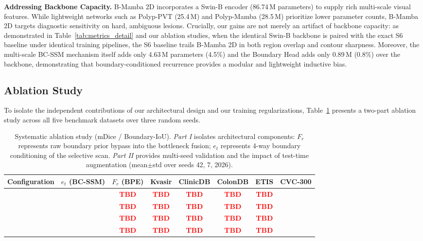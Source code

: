 \documentclass[journal]{IEEEtran}
\newcommand{\tbd}{\textcolor{red}{\textbf{TBD}}}
\newcommand{\ABrows}{%
    \ding{55} & \ding{55} & \tbd & \tbd & \tbd & \tbd & \tbd \\
    \ding{55} & \ding{51} & \tbd & \tbd & \tbd & \tbd & \tbd \\
    \ding{51} & \ding{55} & \tbd & \tbd & \tbd & \tbd & \tbd \\
    \ding{51} & \ding{51} & \tbd & \tbd & \tbd & \tbd & \tbd \\}}
\begin{document}
\textbf{Addressing Backbone Capacity.} B-Mamba 2D incorporates a Swin-B encoder (86.74\,M parameters) to supply rich multi-scale visual features. While lightweight networks such as Polyp-PVT (25.4\,M) and Polyp-Mamba (28.5\,M) prioritize lower parameter counts, B-Mamba 2D targets diagnostic sensitivity on hard, ambiguous lesions. Crucially, our gains are not merely an artifact of backbone capacity: as demonstrated in Table~\ref{tab:metrics_detail} and our ablation studies, when the identical Swin-B backbone is paired with the exact S6 baseline under identical training pipelines, the S6 baseline trails B-Mamba 2D in both region overlap and contour sharpness. Moreover, the multi-scale BC-SSM mechanism itself adds only 4.63\,M parameters (4.5\%) and the Boundary Head adds only 0.89\,M (0.8\%) over the backbone, demonstrating that boundary-conditioned recurrence provides a modular and lightweight inductive bias.

\subsection{Ablation Study}
\label{sec:ablation}
To isolate the independent contributions of our architectural design and our training regularizations, Table~\ref{tab:ablation} presents a two-part ablation study across all five benchmark datasets over three random seeds.

\begin{table}[t]
\centering
\caption{Systematic ablation study (mDice / Boundary-IoU). \emph{Part I} isolates architectural components: $F_r$ represents raw boundary prior bypass into the bottleneck fusion; $e_t$ represents 4-way boundary conditioning of the selective scan. \emph{Part II} provides multi-seed validation and the impact of test-time augmentation (mean$\pm$std over seeds 42, 7, 2026).}
\label{tab:ablation}
\begin{adjustbox}{max width=\textwidth}
\begin{tabular}{l c c c c c c c}
\toprule
Configuration & $e_t$ (BC-SSM) & $F_r$ (BPE) & Kvasir & ClinicDB & ColonDB & ETIS & CVC-300 \\
\midrule
\ABrows
\bottomrule
\end{tabular}
\end{adjustbox}
\end{table}
\end{document}
